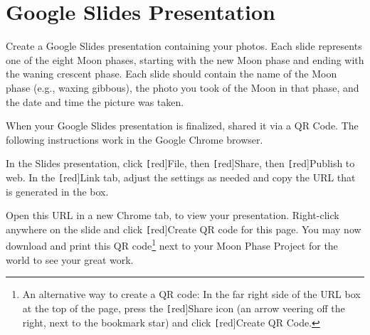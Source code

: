 \documentclass{article}
\begin{document}
\section*{Google Slides Presentation}
Create a Google Slides presentation containing your photos. Each slide represents one of the eight Moon phases, starting with the new Moon phase and ending with the waning crescent phase. Each slide should contain the name of the Moon phase (e.g., waxing gibbous), the photo you took of the Moon in that phase, and the date and time the picture was taken.

\vspace{1em}

When your Google Slides presentation is finalized, shared it via a QR Code. The following instructions work in the Google Chrome browser. 

\vspace{1em}

In the Slides presentation, click \texttt[red]{File}, then \texttt[red]{Share}, then \texttt[red]{Publish to web}. In the \texttt[red]{Link} tab, adjust the settings as needed and copy the URL that is generated in the box. 
\vspace{1em}

\begin{minipage}{0.45\textwidth}
\centering
{}
\end{minipage}%
\hfill
\begin{minipage}{0.45\textwidth}
\centering
{}
\end{minipage}
\vspace{1em}

Open this URL in a new Chrome tab, to view your presentation. Right-click anywhere on the slide and click \texttt[red]{Create QR code for this page}. You may now download and print this QR code\footnote{An alternative way to create a QR code: In the far right side of the URL box at the top of the page, press the \texttt[red]{Share} icon (an arrow veering off the right, next to the bookmark star) and click \texttt[red]{Create QR Code}.} next to your Moon Phase Project for the world to see your great work.
\end{document}
